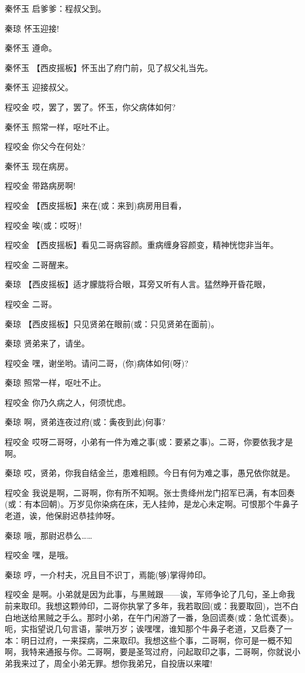 秦怀玉 启爹爹：程叔父到。

秦琼 怀玉迎接!

秦怀玉 遵命。

秦怀玉 【西皮摇板】怀玉出了府门前，见了叔父礼当先。

秦怀玉 迎接叔父。

程咬金 哎，罢了，罢了。怀玉，你父病体如何?

秦怀玉 照常一样，呕吐不止。

程咬金 你父今在何处?

秦怀玉 现在病房。

程咬金 带路病房啊!

程咬金 【西皮摇板】来在(或：来到)病房用目看，

程咬金 唉(或：哎呀)!

程咬金 【西皮摇板】看见二哥病容颜。重病缠身容颜变，精神恍惚非当年。

程咬金 二哥醒来。

秦琼 【西皮摇板】适才朦胧将合眼，耳旁又听有人言。猛然睁开昏花眼，

程咬金 二哥。

秦琼 【西皮摇板】只见贤弟在眼前(或：只见贤弟在面前)。

秦琼 贤弟来了，请坐。

程咬金 嘿，谢坐哟。请问二哥，(你)病体如何(呀)?

秦琼 照常一样，呕吐不止。

程咬金 你乃久病之人，何须忧虑。

秦琼 啊，贤弟连夜过府(或：夤夜到此)何事?

程咬金
哎呀二哥呀，小弟有一件为难之事(或：要紧之事)。二哥，你要依我才是啊。

秦琼 哎，贤弟，你我自结金兰，患难相顾。今日有何为难之事，愚兄依你就是。

程咬金
我说是啊，二哥啊，你有所不知啊。张士贵绛州龙门招军已满，有本回奏(或：有本回朝)。万岁见你染病在床，无人挂帅，是龙心未定啊。可恨那个牛鼻子老道，诶，他保尉迟恭挂帅呀。

秦琼 哦，那尉迟恭么\ldots{}\ldots{}

程咬金 嘿，是哦。

秦琼 哼，一介村夫，况且目不识丁，焉能(够)掌得帅印。

程咬金
是啊。小弟就是因为此事，与黑贼跟------诶，军师争论了几句，圣上命我前来取印。我想这颗帅印，二哥你执掌了多年，我若取回(或：我要取回)，岂不白白地送给黑贼之手么。那时小弟，在午门闲游了一番，急回谎奏(或：急忙谎奏)。呃，实指望说几句言语，蒙哄万岁；诶嘿嘿，谁知那个牛鼻子老道，又启奏了一本：明日过府，一来探病，二来取印。我想这些个事，二哥啊，你可是一概不知啊，我特来通报与你。二哥啊，要是圣驾过府，问起取印之事，二哥啊，你就说小弟我来过了，周全小弟无罪。想你我弟兄，自投唐以来嚯!

